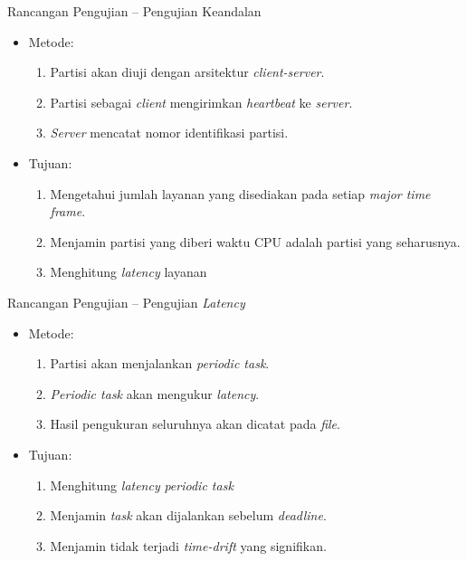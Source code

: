 \documentclass[xetex]{beamer}
\begin{document}
\begin{frame}{Rancangan Pengujian -- Pengujian Keandalan}
	\begin{itemize}
		\item Metode:
			\begin{enumerate}
				\item Partisi akan diuji dengan arsitektur \textit{client-server}.
				\item Partisi sebagai \textit{client} mengirimkan \textit{heartbeat} ke \textit{server}.
				\item \textit{Server} mencatat nomor identifikasi partisi.
			\end{enumerate}
		\item Tujuan:
			\begin{enumerate}
				\item Mengetahui jumlah layanan yang disediakan pada setiap \textit{major time frame}.
				\item Menjamin partisi yang diberi waktu CPU adalah partisi yang seharusnya.
				\item Menghitung \textit{latency} layanan
			\end{enumerate}
	\end{itemize}
\end{frame}
\begin{frame}{Rancangan Pengujian -- Pengujian \textit{Latency}}
	\begin{itemize}
		\item Metode:
			\begin{enumerate}
				\item Partisi akan menjalankan \textit{periodic task}.
				\item \textit{Periodic task} akan mengukur \textit{latency}.
				\item Hasil pengukuran seluruhnya akan dicatat pada \textit{file}.
			\end{enumerate}
		\item Tujuan:
			\begin{enumerate}
				\item Menghitung \textit{latency} \textit{periodic task}
				\item Menjamin \textit{task} akan dijalankan sebelum \textit{deadline}.
				\item Menjamin tidak terjadi \textit{time-drift} yang signifikan.
			\end{enumerate}
	\end{itemize}
\end{frame}
\end{document}
